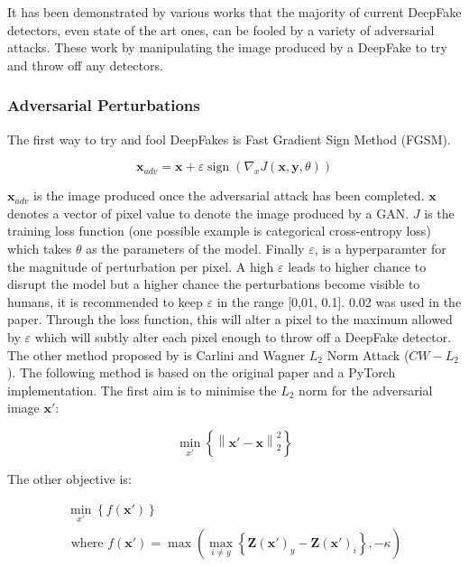 \documentclass{article}
\begin{document}
It has been demonstrated by various works that the majority of current DeepFake detectors, even state of the art ones, can be fooled by a variety of adversarial attacks\cite{juefei2022countering}. These work by manipulating the image produced by a DeepFake to try and throw off any detectors.

\subsubsection{Adversarial Perturbations}

The first way to try and fool DeepFakes is Fast Gradient Sign Method (FGSM)\cite{pertubations}.

\begin{equation}
    {{\mathbf{x}}_{adv}} = {\mathbf{x}} + \varepsilon \operatorname{sign}({{\nabla _x}J({\mathbf{x}},{\mathbf{y}},\theta )})
\end{equation}

$\mathbf{x}_{adv}$ is the image produced once the adversarial attack has been completed. $\mathbf{x}$ denotes a vector of pixel value to denote the image produced by a GAN. $J$ is the training loss function (one possible example is categorical cross-entropy loss) which takes $\theta$ as the parameters of the model. Finally $\varepsilon$, is a hyperparamter for the magnitude of perturbation per pixel. A high $\varepsilon$ leads to higher chance to disrupt the model but a higher chance the perturbations become visible to humans, it is recommended to keep $\varepsilon$ in the range [0,01, 0.1]. 0.02 was used in the paper\cite{pertubations}. Through the loss function, this will alter a pixel to the maximum allowed by $\varepsilon$ which will subtly alter each pixel enough to throw off a DeepFake detector.\\

The other method proposed by \cite{pertubations} is Carlini and Wagner $L_2$ Norm Attack ($CW-L_2$). The following method is based on the original paper\cite{carlini2017towards} and a PyTorch implementation\cite{cwl2python}. The first aim is to minimise the $L_2$ norm for the adversarial image $\mathbf{x}'$:

\begin{equation}
\label{eq:l2_norm}
\mathop {\min }\limits_{x'} \left\{ {\left\| {{\mathbf{x}}' - {\mathbf{x}}} \right\|_2^2} \right\}
\end{equation}

The other objective is:

\begin{equation}
\label{eq:min_f(x')}
\begin{array}{c} 
    {\mathop {\min }\limits_{x'} \left\{ {f\left( {{\mathbf{x}}'} \right)} \right\}} \\ {{\text{ where }}f\left( {{\mathbf{x}}'} \right) = \max \left( {{{\max }_{i \ne y}}\left\{ {{\mathbf{Z}}{{\left( {{\mathbf{x}}'} \right)}_y} - {\mathbf{Z}}{{\left( {{\mathbf{x}}'} \right)}_i}} \right\}, - \kappa } \right)}
\end{array}
\end{equation}
\end{document}
